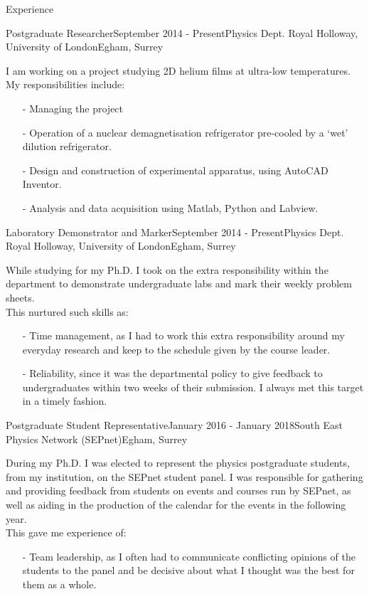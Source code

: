 \documentclass{resume} %
\begin{document}
\begin{rSection}{Experience}

\begin{rSubsection}{Postgraduate Researcher}{September 2014 - Present}{Physics Dept. Royal Holloway, University of London}{Egham, Surrey}
{\small
\item[] I am working on a project studying 2D helium films at ultra-low temperatures.\\
My responsibilities include:
\begin{enumerate}[noitemsep]
\item[-] Managing the project
\item[-] Operation of a nuclear demagnetisation refrigerator pre-cooled by a `wet' dilution refrigerator.
\item[-] Design and construction of experimental apparatus, using AutoCAD Inventor.
\item[-] Analysis and data acquisition using Matlab, Python and Labview.
\end{enumerate}
}
\end{rSubsection}

\begin{rSubsection}{Laboratory Demonstrator and Marker}{September 2014 - Present}{Physics Dept. Royal Holloway, University of London}{Egham, Surrey}
{\small
\item[] While studying for my Ph.D. I took on the extra responsibility within the department to demonstrate undergraduate labs and mark their weekly problem sheets.\\
This nurtured such skills as:
\begin{enumerate}[noitemsep]
\item[-] Time management, as I had to work this extra responsibility around my everyday research and keep to the schedule given by the course leader.
\item[-] Reliability, since it was the departmental policy to give feedback to undergraduates within two weeks of their submission. I always met this target in a timely fashion.
\end{enumerate}
}
\end{rSubsection}

\begin{rSubsection}{Postgraduate Student Representative}{January 2016 - January 2018}{South East Physics Network (SEPnet)}{Egham, Surrey}
{\small
\item[] During my Ph.D. I was elected to represent the physics postgraduate students, from my institution, on the SEPnet student panel. I was responsible for gathering and providing feedback from students on events and courses run by SEPnet, as well as aiding in the production of the calendar for the events in the following year. \\
This gave me experience of:
\begin{enumerate}[noitemsep]
\item[-] Team leadership, as I often had to communicate conflicting opinions of the students to the panel and be decisive about what I thought was the best for them as a whole.
\end{enumerate}
}
\end{rSubsection}


\end{rSection}
\end{document}
